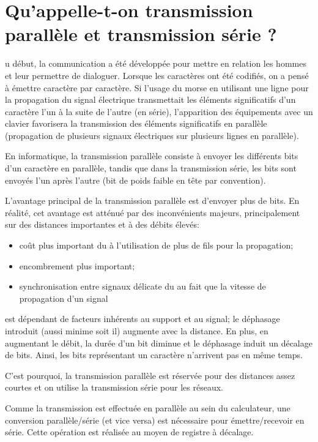 \section{Qu'appelle-t-on transmission parallèle et transmission série ?}
u début, la communication a été développée pour mettre en relation les hommes et leur
permettre de dialoguer. Lorsque les caractères ont été codifiés, on a pensé à émettre
caractère par caractère. Si l'usage du morse en utilisant une ligne pour la propagation du
signal électrique transmettait les éléments significatifs d'un caractère l'un à la suite de
l'autre (en série), l'apparition des équipements avec un clavier favorisera la transmission
des éléments significatifs en parallèle (propagation de plusieurs signaux électriques sur
plusieurs lignes en parallèle).

En informatique, la transmission parallèle consiste à envoyer les différents bits d'un
caractère en parallèle, tandis que dans la transmission série, les bits sont envoyés l'un
après l'autre (bit de poids faible en tête par convention).

L'avantage principal de la transmission parallèle est d'envoyer plus de bits. En réalité, cet
avantage est atténué par des inconvénients majeurs, principalement sur des distances
importantes et à des débits élevés:

\begin{itemize}
	\item coût plus important du à l'utilisation de plus de fils pour la propagation;
	\item encombrement plus important;
	\item synchronisation entre signaux délicate du au fait que la vitesse de propagation d'un signal
\end{itemize}
est dépendant de facteurs inhérents au support et au signal; le déphasage introduit (aussi
minime soit il) augmente avec la distance. En plus, en augmentant le débit, la durée d'un bit
diminue et le déphasage induit un décalage de bits. Ainsi, les bits représentant un caractère
n'arrivent pas en même temps.

C'est pourquoi, la transmission parallèle est réservée pour des distances assez courtes et on
utilise la transmission série pour les réseaux.

Comme la transmission est effectuée en parallèle au sein du calculateur, une conversion
parallèle/série (et vice versa) est nécessaire pour émettre/recevoir en série. Cette opération
est réalisée au moyen de registre à décalage.


